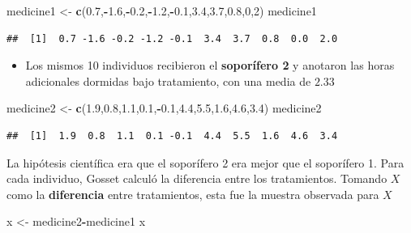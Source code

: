 \documentclass[
]{book}
\newenvironment{Shaded}{\begin{snugshade}}{\end{snugshade}}
\newcommand{\DecValTok}[1]{\textcolor[rgb]{0.00,0.00,0.81}{#1}}
\newcommand{\FloatTok}[1]{\textcolor[rgb]{0.00,0.00,0.81}{#1}}
\newcommand{\FunctionTok}[1]{\textcolor[rgb]{0.13,0.29,0.53}{\textbf{#1}}}
\newcommand{\NormalTok}[1]{#1}
\newcommand{\OtherTok}[1]{\textcolor[rgb]{0.56,0.35,0.01}{#1}}
\newcommand{\SpecialCharTok}[1]{\textcolor[rgb]{0.81,0.36,0.00}{\textbf{#1}}}
\providecommand{\tightlist}{%
  \setlength{\itemsep}{0pt}\setlength{\parskip}{0pt}}
\begin{document}
\begin{Shaded}
\begin{Highlighting}[]
\NormalTok{medicine1 }\OtherTok{\textless{}{-}} \FunctionTok{c}\NormalTok{(}\FloatTok{0.7}\NormalTok{,}\SpecialCharTok{{-}}\FloatTok{1.6}\NormalTok{,}\SpecialCharTok{{-}}\FloatTok{0.2}\NormalTok{,}\SpecialCharTok{{-}}\FloatTok{1.2}\NormalTok{,}\SpecialCharTok{{-}}\FloatTok{0.1}\NormalTok{,}\FloatTok{3.4}\NormalTok{,}\FloatTok{3.7}\NormalTok{,}\FloatTok{0.8}\NormalTok{,}\DecValTok{0}\NormalTok{,}\DecValTok{2}\NormalTok{)}
\NormalTok{medicine1}
\end{Highlighting}
\end{Shaded}

\begin{verbatim}
##  [1]  0.7 -1.6 -0.2 -1.2 -0.1  3.4  3.7  0.8  0.0  2.0
\end{verbatim}

\begin{itemize}
\tightlist
\item
  Los mismos 10 individuos recibieron el \textbf{soporífero 2} y anotaron las horas adicionales dormidas bajo tratamiento, con una media de \(2.33\)
\end{itemize}

\begin{Shaded}
\begin{Highlighting}[]
\NormalTok{medicine2 }\OtherTok{\textless{}{-}} \FunctionTok{c}\NormalTok{(}\FloatTok{1.9}\NormalTok{,}\FloatTok{0.8}\NormalTok{,}\FloatTok{1.1}\NormalTok{,}\FloatTok{0.1}\NormalTok{,}\SpecialCharTok{{-}}\FloatTok{0.1}\NormalTok{,}\FloatTok{4.4}\NormalTok{,}\FloatTok{5.5}\NormalTok{,}\FloatTok{1.6}\NormalTok{,}\FloatTok{4.6}\NormalTok{,}\FloatTok{3.4}\NormalTok{)}
\NormalTok{medicine2}
\end{Highlighting}
\end{Shaded}

\begin{verbatim}
##  [1]  1.9  0.8  1.1  0.1 -0.1  4.4  5.5  1.6  4.6  3.4
\end{verbatim}

La hipótesis científica era que el soporífero 2 era mejor que el soporífero 1. Para cada individuo, Gosset calculó la diferencia entre los tratamientos. Tomando \(X\) como la \textbf{diferencia} entre tratamientos, esta fue la muestra observada para \(X\)

\begin{Shaded}
\begin{Highlighting}[]
\NormalTok{x }\OtherTok{\textless{}{-}}\NormalTok{ medicine2}\SpecialCharTok{{-}}\NormalTok{medicine1}
\NormalTok{x}
\end{Highlighting}
\end{Shaded}
\end{document}
